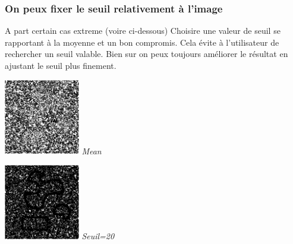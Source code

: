 \documentclass[a4,12pt]{article}
\begin{document}
\subsubsection{On peux fixer le seuil relativement à l'image}
A part certain cas extreme (voire ci-dessous) Choisire une valeur de seuil se rapportant à la moyenne
et un bon compromis. Cela évite à l'utilisateur de rechercher un seuil valable.
Bien sur on peux toujours améliorer le résultat en ajustant le seuil plus finement.\\
\noindent
\begin{center}
\begin{minipage}[c]{0.20\linewidth}
	\begin{center}
		\includegraphics[width = 33mm]{./img/p2test_grad_mean_formes1pets5.jpg}
		\textit{Mean}
	\end{center}
\end{minipage}
\begin{minipage}[c]{0.20\linewidth}
	\begin{center}
		\includegraphics[width = 33mm]{./img/p2test_grad_const_formes1pets5.jpg}
		\textit{Seuil=20}
	\end{center}
\end{minipage}
\end{center}
\end{document}
